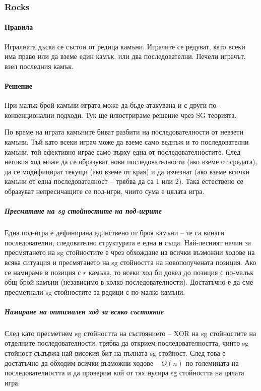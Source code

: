\documentclass[a4paper]{article}
\begin{document}
    \subsubsection{Rocks}
    \paragraph{Правила}
    Игралната дъска се състои от редица камъни. Играчите се редуват, като всеки
    има право или да вземе един камък, или два последователни. Печели играчът, взел
    последния камък.

    \paragraph{Решение}
    При малък брой камъни играта може да бъде атакувана и с други
    по-конвенционални подходи. Тук ще илюстрираме решение чрез SG теорията.

    По време на играта камъните биват разбити на последователности от невзети
    камъни. Тъй като всеки играч може да вземе само веднъж и то последователни
    камъни, той ефективно играе само върху една от последователностите. След
    неговия ход може да се образуват нови последователности (ако вземе от
    средата), да се модифицират текущи (ако вземе от края) и да изчезнат (ако
    вземе всички камъни от една последователност -- трябва да са $1$ или $2$).
    Така естествено се образуват непресичащите се под-игри, чиито сума е цялата
    игра.

    \subparagraph{Пресмятане на sg стойностите на под-игрите}
    Една под-игра е дефинирана единствено от броя камъни -- те са винаги
    последователни, следователно структурата е една и съща. Най-лесният начин
    за пресмятането на sg стойностите е чрез обхождане на всички възможни
    ходове на всяка ситуация и пресмятането на sg стойността на новополучената
    позиция. Ако се намираме в позиция с $r$ камъка, то всеки ход би довел до
    позиция с по-малък общ брой камъни (независимо в колко последователности).
    Достатъчно е да сме пресметнали sg стойностите за редици с по-малко камъни.

    \subparagraph{Намиране на оптимален ход за всяко състояние}
    След като пресметнем sg стойността на състоянието -- XOR на sg стойностите
    на отделните последователности, трябва да открием последователността, чиито
    sg стойност съдържа най-високия бит на пълната sg стойност. След това
    е достатъчно да обходим всички възможни ходове -- $\Theta(n)$ по големината
    на последователността и да проверим кой от тях нулира sg стойността на
    цялата игра.
\end{document}
